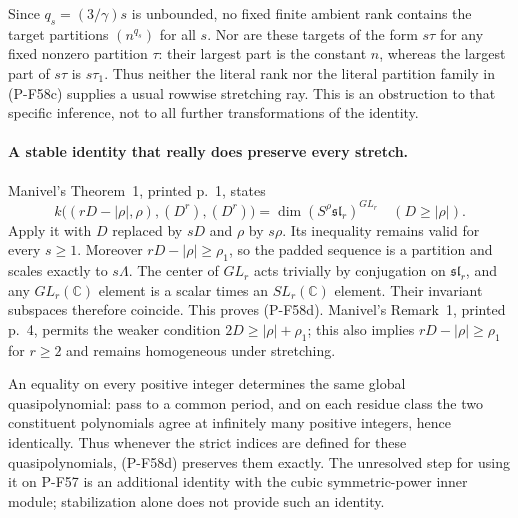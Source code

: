Since $q_s=(3/\gamma)s$ is unbounded, no fixed finite
ambient rank contains the target partitions $(n^{q_s})$
for all $s$.  Nor are these targets of the form $s\tau$
for any fixed nonzero partition $\tau$: their largest part
is the constant $n$, whereas the largest part of $s\tau$
is $s\tau_1$.  Thus neither the literal rank nor the
literal partition family in (P-F58c) supplies a usual
rowwise stretching ray.  This is an obstruction to that
specific inference, not to all further transformations
of the identity.

\paragraph{A stable identity that really does preserve every stretch.}
Manivel's Theorem~1, printed p.~1, states
\[
 k\bigl((rD-|\rho|,\rho),(D^r),(D^r)\bigr)
                  =\dim(S^\rho\mathfrak{sl}_r)^{GL_r}
       \quad(D\ge|\rho|).
\]
Apply it with $D$ replaced by $sD$ and $\rho$ by $s\rho$.
Its inequality remains valid for every $s\ge1$.
Moreover $rD-|\rho|\ge\rho_1$, so the padded sequence
is a partition and scales exactly to $s\Lambda$.
The center of $GL_r$ acts trivially by conjugation on
$\mathfrak{sl}_r$, and any $GL_r(\mathbb C)$ element is
a scalar times an $SL_r(\mathbb C)$ element.  Their
invariant subspaces therefore coincide.  This proves
(P-F58d).  Manivel's Remark~1, printed p.~4, permits the
weaker condition $2D\ge|\rho|+\rho_1$; this also implies
$rD-|\rho|\ge\rho_1$ for $r\ge2$ and remains homogeneous
under stretching.

An equality on every positive integer determines the same
global quasipolynomial: pass to a common period, and on
each residue class the two constituent polynomials agree
at infinitely many positive integers, hence identically.
Thus whenever the strict indices are defined for these
quasipolynomials, (P-F58d) preserves them exactly.  The
unresolved step for using it on P-F57 is an additional
identity with the cubic symmetric-power inner module;
stabilization alone does not provide such an identity.

